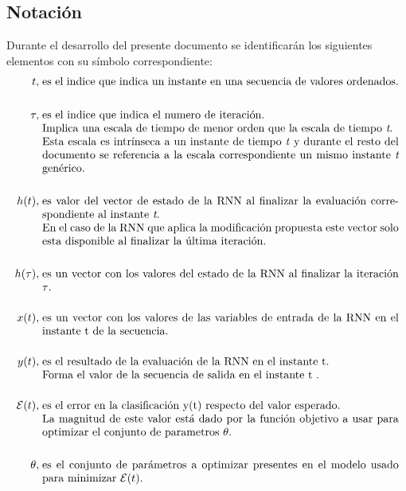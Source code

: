 \documentclass{article}
\begin{document}
	\subsection{Notación}
	Durante el desarrollo del presente documento se identificarán los siguientes elementos con su símbolo correspondiente:
	\begin{equation*}
	\begin{split}
	t, \; &\parbox[t]{32em}{ es el indice que indica un instante en una secuencia de valores ordenados.}\\
	\quad\\
	\tau, \; &\parbox[t]{32em}{ es el indice que indica el numero de iteración. \\
		Implica una escala de tiempo de menor orden que la escala de tiempo \textit{t}.\\
		Esta escala es intrínseca a un instante de tiempo \textit{t} y durante el resto del documento se referencia a la escala correspondiente un mismo instante \textit{t} genérico.}\\
	\quad\\
	h(t), \; &\parbox[t]{32em}{ es valor del vector de estado de la RNN al finalizar la evaluación correspondiente al instante \textit{t}.\\
		En el caso de la RNN que aplica la modificación propuesta este vector solo esta disponible al finalizar la última iteración.}\\
	\quad\\
	h(\tau), \; &\parbox[t]{32em}{ es un vector con los valores del estado de la RNN al finalizar la iteración $\tau$.}\\
	\quad\\
	x(t), \; &\parbox[t]{32em}{ es un vector con los valores de las variables de entrada de la RNN en el instante t de la secuencia.}\\
	\quad\\
	y(t), \; &\parbox[t]{32em}{ es el resultado de la evaluación de la RNN en el instante t.\\
		Forma el valor de la secuencia de salida en el instante t .}\\
	\quad\\
	\mathcal{E}(t), \; &\parbox[t]{32em}{ es el error en la clasificación y(t) respecto del valor esperado.\\
		La magnitud de este valor está dado por la función objetivo a usar para optimizar el conjunto de parametros $\theta$.}\\
	\quad\\
	\theta, \; &\parbox[t]{32em}{ es el conjunto de parámetros a optimizar presentes en el modelo usado para minimizar $\mathcal{E}(t)$.}\\
	\quad\\
	\end{split}
	\end{equation*}
	
\end{document}
